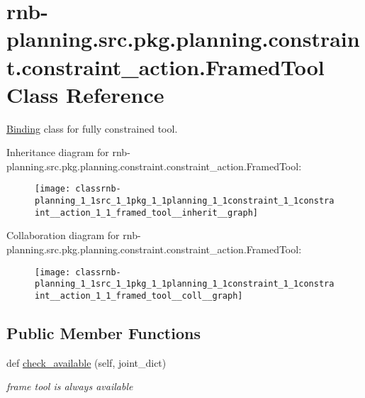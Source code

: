 \hypertarget{classrnb-planning_1_1src_1_1pkg_1_1planning_1_1constraint_1_1constraint__action_1_1_framed_tool}{}\section{rnb-\/planning.src.\+pkg.\+planning.\+constraint.\+constraint\+\_\+action.\+Framed\+Tool Class Reference}
\label{classrnb-planning_1_1src_1_1pkg_1_1planning_1_1constraint_1_1constraint__action_1_1_framed_tool}


\hyperlink{classrnb-planning_1_1src_1_1pkg_1_1planning_1_1constraint_1_1constraint__action_1_1_binding}{Binding} class for fully constrained tool.  




Inheritance diagram for rnb-\/planning.src.\+pkg.\+planning.\+constraint.\+constraint\+\_\+action.\+Framed\+Tool\+:
\nopagebreak
\begin{figure}[H]
\begin{center}
\leavevmode
\texttt{[image: classrnb-planning\_1\_1src\_1\_1pkg\_1\_1planning\_1\_1constraint\_1\_1constraint\_\_action\_1\_1\_framed\_tool\_\_inherit\_\_graph]}
\end{center}
\end{figure}


Collaboration diagram for rnb-\/planning.src.\+pkg.\+planning.\+constraint.\+constraint\+\_\+action.\+Framed\+Tool\+:
\nopagebreak
\begin{figure}[H]
\begin{center}
\leavevmode
\texttt{[image: classrnb-planning\_1\_1src\_1\_1pkg\_1\_1planning\_1\_1constraint\_1\_1constraint\_\_action\_1\_1\_framed\_tool\_\_coll\_\_graph]}
\end{center}
\end{figure}
\subsection*{Public Member Functions}
\begin{DoxyCompactItemize}
\item 
\mbox{\label{classrnb-planning_1_1src_1_1pkg_1_1planning_1_1constraint_1_1constraint__action_1_1_framed_tool_a3ba42fa0050f9acda5549204e1c1028f}} 
def \hyperlink{classrnb-planning_1_1src_1_1pkg_1_1planning_1_1constraint_1_1constraint__action_1_1_framed_tool_a3ba42fa0050f9acda5549204e1c1028f}{check\+\_\+available} (self, joint\+\_\+dict)
\begin{DoxyCompactList}\small\item\em frame tool is always available \end{DoxyCompactList}\end{DoxyCompactItemize}
